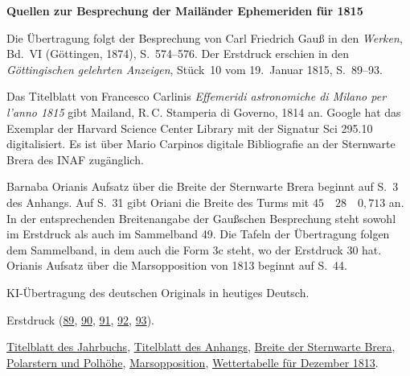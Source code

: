 \clearpage\thispagestyle{empty}
\begin{center}\Large\bfseries Quellen zur Besprechung der Mailänder Ephemeriden für 1815\end{center}

Die Übertragung folgt der Besprechung von Carl Friedrich Gauß in den \emph{Werken}, Bd.~VI (Göttingen, 1874), S.~574--576. Der Erstdruck erschien in den \emph{Göttingischen gelehrten Anzeigen}, Stück~10 vom 19.~Januar 1815, S.~89--93.

Das Titelblatt von Francesco Carlinis \emph{Effemeridi astronomiche di Milano per l’anno 1815} gibt Mailand, R.\,C. Stamperia di Governo, 1814 an. Google hat das Exemplar der Harvard Science Center Library mit der Signatur Sci 295.10 digitalisiert. Es ist über Mario Carpinos digitale Bibliografie an der Sternwarte Brera des INAF zugänglich.

Barnaba Orianis Aufsatz über die Breite der Sternwarte Brera beginnt auf S.~3 des Anhangs. Auf S.~31 gibt Oriani die Breite des Turms mit $45\quad28\quad0{,}713$ an. In der entsprechenden Breitenangabe der Gaußschen Besprechung steht sowohl im Erstdruck als auch im Sammelband 49. Die Tafeln der Übertragung folgen dem Sammelband, in dem auch die Form 3c steht, wo der Erstdruck 30 hat. Orianis Aufsatz über die Marsopposition von 1813 beginnt auf S.~44.

KI-Übertragung des deutschen Originals in heutiges Deutsch.

Erstdruck (\href{https://images.p.sub.uni-goettingen.de/iiif/image/gdz:PPN319721507_1815:00000091/full/1650,/0/default.jpg}{89}, \href{https://images.p.sub.uni-goettingen.de/iiif/image/gdz:PPN319721507_1815:00000092/full/1650,/0/default.jpg}{90}, \href{https://images.p.sub.uni-goettingen.de/iiif/image/gdz:PPN319721507_1815:00000093/full/1650,/0/default.jpg}{91}, \href{https://images.p.sub.uni-goettingen.de/iiif/image/gdz:PPN319721507_1815:00000094/full/1650,/0/default.jpg}{92}, \href{https://images.p.sub.uni-goettingen.de/iiif/image/gdz:PPN319721507_1815:00000095/full/1650,/0/default.jpg}{93}).

\href{https://www1.brera.inaf.it/~mario.carpino/Biblioteca_Digitale/Effemeridi_Milano/mirror/EM1815b.pdf#page=8}{Titelblatt des Jahrbuchs}, \href{https://www1.brera.inaf.it/~mario.carpino/Biblioteca_Digitale/Effemeridi_Milano/mirror/EM1815b.pdf#page=144}{Titelblatt des Anhangs}, \href{https://www1.brera.inaf.it/~mario.carpino/Biblioteca_Digitale/Effemeridi_Milano/mirror/EM1815b.pdf#page=146}{Breite der Sternwarte Brera}, \href{https://www1.brera.inaf.it/~mario.carpino/Biblioteca_Digitale/Effemeridi_Milano/mirror/EM1815b.pdf#page=174}{Polarstern und Polhöhe}, \href{https://www1.brera.inaf.it/~mario.carpino/Biblioteca_Digitale/Effemeridi_Milano/mirror/EM1815b.pdf#page=187}{Marsopposition}, \href{https://www1.brera.inaf.it/~mario.carpino/Biblioteca_Digitale/Effemeridi_Milano/mirror/EM1815b.pdf#page=255}{Wettertabelle für Dezember 1813}.

\clearpage

